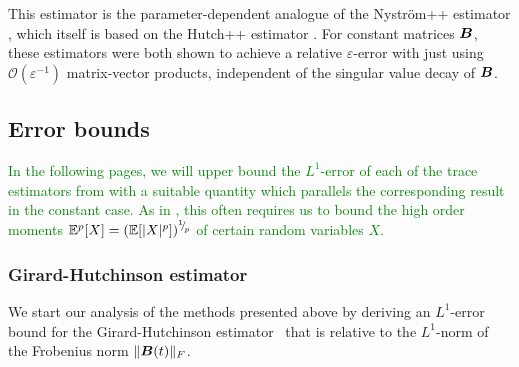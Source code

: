 This estimator is the parameter-dependent analogue of the Nyström++ estimator \cite{persson-2022-improved-variants}, which itself is based on the Hutch++ estimator \cite{meyer-2021-hutch-optimal}. For constant matrices $\boldsymbol{B}$, these estimators were both shown to achieve a relative $\varepsilon$-error with just using $\mathcal{O}(\varepsilon^{-1})$ matrix-vector products, independent of the singular value decay of $\boldsymbol{B}$.

%

\subsection{Error bounds}

\textcolor{green}{In the following pages, we will upper bound the $L^1$-error of each of the trace estimators from  with a suitable quantity which parallels the corresponding result in the constant case. As in \cite{kressner-2024-randomized-lowrank}, this often requires us to bound the high order moments $\mathbb{E}^p[X] = (\mathbb{E}[|X|^p])^{{}^{1}{\mskip -5mu/\mskip -3mu}_{p}}$ of certain random variables $X$.}

\subsubsection{Girard-Hutchinson estimator}
\label{subsec:hutchinson}

\color{blue}

We start our analysis of the methods presented above by deriving an $L^1$-error bound for the Girard-Hutchinson estimator~ that is relative to the $L^1$-norm of the Frobenius norm $\lVert \boldsymbol{B}(t) \rVert _F$.

